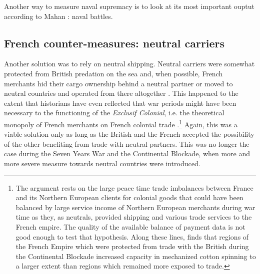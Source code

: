 \documentclass[12pt,a4paper,notitlepage,english]{article}
\begin{document}
 Another way to measure naval supremacy is to look at its most important ouptut according to Mahan : naval battles.
 

 \subsection{French counter-measures: neutral carriers}

 Another solution was to rely on neutral shipping. Neutral carriers were somewhat protected from British predation on the sea and, when possible, French merchants hid their cargo ownership behind a neutral partner or moved to neutral countries and operated from there altogether \citep{Marzagalli2016}. This happened to the extent that historians have even reflected that war periods might have been necessary to the functioning of the \textit{Exclusif Colonial}, i.e. the theoretical monopoly of French merchants on French colonial trade \citep{Lespagnol1997, Morineau1997, Marzagalli2016}.\footnote{
 	The argument rests on the large peace time trade imbalances between France and its Northern European clients for colonial goods that could have been balanced by large service income of Northern European merchants during war time as they, as neutrals, provided shipping and various trade services to the French empire. The quality of the available balance of payment data is not good enough to test that hypothesis. Along these lines, \cite{Juhasz2018} finds that regions of the French Empire which were protected from trade with the British during the Continental Blockade increased capacity in mechanized cotton spinning to a larger extent than regions which remained more exposed to trade.}
 Again, this was a viable solution only as long as the British and the French accepted the possibility of the other benefiting from trade with neutral partners. This was no longer the case during the Seven Years War and the Continental Blockade, when more and more severe measure towards neutral countries were introduced. 
 
\end{document}
